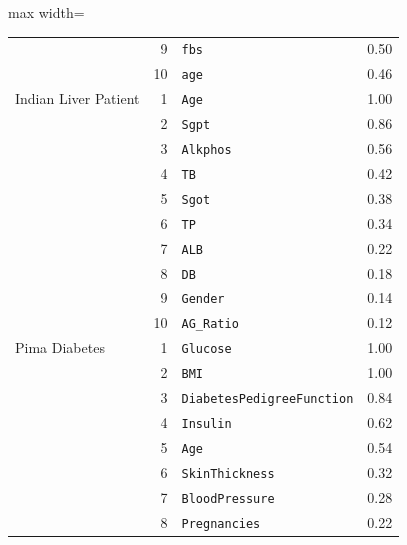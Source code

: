 \begin{table}[!t]
\begin{adjustbox}{max width=\linewidth}
\begin{tabular}{lrlr}
 & 9 & \texttt{fbs} & 0.50 \\
 & 10 & \texttt{age} & 0.46 \\
Indian Liver Patient & 1 & \texttt{Age} & 1.00 \\
 & 2 & \texttt{Sgpt} & 0.86 \\
 & 3 & \texttt{Alkphos} & 0.56 \\
 & 4 & \texttt{TB} & 0.42 \\
 & 5 & \texttt{Sgot} & 0.38 \\
 & 6 & \texttt{TP} & 0.34 \\
 & 7 & \texttt{ALB} & 0.22 \\
 & 8 & \texttt{DB} & 0.18 \\
 & 9 & \texttt{Gender} & 0.14 \\
 & 10 & \texttt{AG\_Ratio} & 0.12 \\
Pima Diabetes & 1 & \texttt{Glucose} & 1.00 \\
 & 2 & \texttt{BMI} & 1.00 \\
 & 3 & \texttt{DiabetesPedigreeFunction} & 0.84 \\
 & 4 & \texttt{Insulin} & 0.62 \\
 & 5 & \texttt{Age} & 0.54 \\
 & 6 & \texttt{SkinThickness} & 0.32 \\
 & 7 & \texttt{BloodPressure} & 0.28 \\
 & 8 & \texttt{Pregnancies} & 0.22 \\
\bottomrule
\end{tabular}
\end{adjustbox}
\end{table}
